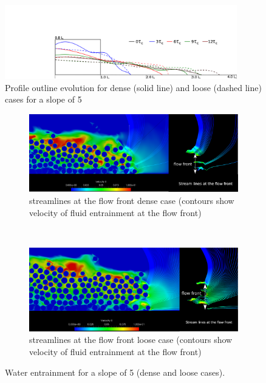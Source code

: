 \documentclass[12pt,twoside]{tuhhproc-en}
\begin{document}
\begin{figure}[htpb]
\centering
\includegraphics[width=0.9\textwidth]{figs/slope5_dense_loose_outline}
\caption{Profile outline evolution for dense (solid line) and loose (dashed line) cases for a slope of \si{5}{\degree}}
\label{fig:slope-outline}
\end{figure}

%
\begin{figure}[!ht]
	\centering
\begin{subfigure}[b]{0.85\textwidth}
	\centering
    \includegraphics[width=\textwidth]{figs/slope5_water_entrainment/slope5_dense_15d_water_entrainment}
    \caption{streamlines at the flow front dense case (contours show velocity of fluid entrainment at the flow front)}
    \label{fig:water_entrainment_a08_dense}
\end{subfigure}\\
\begin{subfigure}[b]{0.85\textwidth}
	\centering
    \includegraphics[width=\textwidth]{figs/slope5_water_entrainment/slope5_loose_15d_water_entrainment}
    \caption{streamlines at the flow front loose case (contours show velocity of fluid entrainment at the flow front)}
    \label{fig:water_entrainment_a08_loose}
\end{subfigure}
\caption{Water entrainment for a slope of \si{5}{\degree} (dense and loose cases).}
\label{fig:water_entrainment_loose_dense}
\end{figure}
\end{document}

